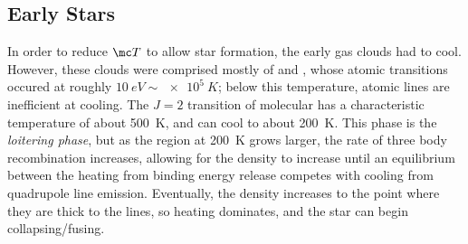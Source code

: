 \documentclass[12pt]{article}
\begin{document}
\subsection{Early Stars}
In order to reduce \( \mc T \) to allow star formation, the early gas clouds had to cool. However, these clouds were comprised mostly of  and , whose atomic transitions occured at roughly \( \SI{10}{eV}\sim \SI{e5}{K} \); below this temperature, atomic lines are inefficient at cooling. The \( J=2 \) transition of molecular  has a characteristic temperature of about \SI{500}{K}, and can cool to about \SI{200}{K}. This phase is the \emph{loitering phase}, but as the region at \SI{200}{K} grows larger, the rate of three body recombination increases, allowing for the density to increase until an equilibrium between the heating from binding energy release competes with cooling from quadrupole line emission. Eventually, the density increases to the point where they are thick to the  lines, so heating dominates, and the star can begin collapsing/fusing.
\end{document}
